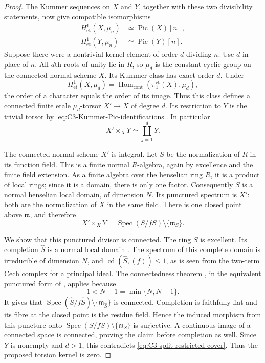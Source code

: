 \begin{proof}
The Kummer sequences on $X$ and $Y$, together with
these two divisibility statements, now give
compatible isomorphisms
\begin{equation}\label{eq:C3-Kummer-Pic-identifications}
\begin{aligned}
 H^1_{\mathrm{et}}(X,\mu_n)&\simeq\operatorname{Pic}(X)[n],\\
 H^1_{\mathrm{et}}(Y,\mu_n)&\simeq\operatorname{Pic}(Y)[n].
\end{aligned}
\end{equation}
Suppose there were a nontrivial kernel element of
order $d$ dividing $n$. Use $d$ in place of $n$.
All $d$th roots of unity lie in $R$, so $\mu_d$ is
the constant cyclic group on the connected normal
scheme $X$. Its Kummer class has exact order $d$.
Under
\[
 H^1_{\mathrm{et}}(X,\mu_d)
       =\operatorname{Hom}_{\mathrm{cont}}
                       (\pi_1^{\mathrm{et}}(X),\mu_d),
\]
the order of a character equals the order of its
image. Thus this class defines a connected finite
etale $\mu_d$-torsor $X'\to X$ of degree $d$.
Its restriction to $Y$ is the trivial torsor by
\eqref{eq:C3-Kummer-Pic-identifications}. In particular
\begin{equation}\label{eq:C3-split-restricted-cover}
                       X'\times_XY\simeq\coprod_{j=1}^{d}Y.
\end{equation}

The connected normal scheme $X'$ is integral.
Let $S$ be the normalization of $R$ in its function
field. This is a finite normal $R$-algebra, again
by excellence and the finite field extension.
As a finite algebra over the henselian ring $R$,
it is a product of local rings; since it is a
domain, there is only one factor. Consequently
$S$ is a normal henselian local domain, of
dimension $N$. Its punctured spectrum is $X'$:
both are the normalization of $X$ in the same
field. There is one closed point above
$\mathfrak m$, and therefore
\[
 X'\times_XY
       =\operatorname{Spec}(S/fS)\setminus\{\mathfrak m_S\}.
\]

We show that this punctured divisor is connected.
The ring $S$ is excellent. Its completion
$\widehat S$ is a normal local domain
\citep[Lemma 15.53.6, Tag 0C23]{D_StacksLocalPicard}.
The spectrum of this complete domain is irreducible
of dimension $N$, and
$\operatorname{cd}(\widehat S,(f))\le1$, as is seen
from the two-term Cech complex for a principal
ideal. The connectedness theorem
\citep[Theorem 1.6, p.~2497]{D_Varbaro2009},
in the equivalent punctured form of
\citet[Lemma 52.14.1, Tag 0ECR]{D_StacksLocalPicard},
applies because
\[
              1<N-1=\min\{N,N-1\}.
\]
It gives that
$\operatorname{Spec}(\widehat S/f\widehat S)
\setminus\{\mathfrak m_{\widehat S}\}$ is connected.
Completion is faithfully flat and its fibre at
the closed point is the residue field. Hence
the induced morphism from this puncture onto
$\operatorname{Spec}(S/fS)\setminus\{\mathfrak m_S\}$
is surjective. A continuous image of a connected
space is connected, proving the claim before
completion as well. Since $Y$ is nonempty and
$d>1$, this contradicts
\eqref{eq:C3-split-restricted-cover}.
Thus the proposed torsion kernel is zero.
\end{proof}

